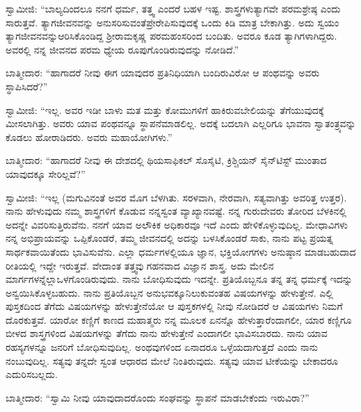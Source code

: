 \vskip 3pt

ಸ್ವಾಮೀಜಿ: “ಬಾಲ್ಯದಿಂದಲೂ ನನಗೆ ಧರ್ಮ, ತತ್ತ್ವ ಎಂದರೆ ಬಹಳ ಇಷ್ಟ. ಶಾಸ್ತ್ರಗಳು\break ತ್ಯಾಗವೇ ಪರಮಶ್ರೇಷ್ಠ ಎಂದು ಸಾರುತ್ತವೆ. ತ್ಯಾಗಜೀವನವನ್ನು ಅನುಸರಿಸುವಂತೆ\break ಪ್ರೇರೇಪಿಸುವುದಕ್ಕೆ ಒಂದು ಕಿಡಿ ಮಾತ್ರ ಬೇಕಾಗಿತ್ತು. ಅದು ಸ್ವಯಂ ತ್ಯಾಗಜೀವನವನ್ನು\break ಆರಿಸಿಕೊಂಡಿದ್ದ ಶ‍್ರೀರಾಮಕೃಷ್ಣ ಪರಮಹಂಸರಿಂದ ಬಂದಿತು. ಅವರೂ ಕೂಡ ತ್ಯಾಗಿಗಳಾಗಿದ್ದರು. ಅವರಲ್ಲಿ ನನ್ನ ಜೀವನದ ಪರಮ ಧ್ಯೇಯ ರೂಪುಗೊಂಡಿರುವುದನ್ನು ನೋಡಿದೆ.”

\vskip 3pt

ಬಾತ್ಮೀದಾರ: “ಹಾಗಾದರೆ ನೀವು ಈಗ ಯಾವುದರ ಪ್ರತಿನಿಧಿಯಾಗಿ ಬಂದಿರುವಿರೋ ಆ ಪಂಥವನ್ನು ಅವರು ಸ್ಥಾಪಿಸಿದರೆ?”

\vskip 3pt

ಸ್ವಾಮೀಜಿ: “ಇಲ್ಲ. ಅವರ ಇಡೀ ಬಾಳು ಮತ ಮತ್ತು ಕೋಮುಗಳಿಗೆ ಹಾಕಿರುವ\break ಬೇಲಿಯನ್ನು ತೆಗೆಯುವುದಕ್ಕೆ ಮೀಸಲಾಗಿತ್ತು. ಅವರು ಯಾವ ಪಂಥವನ್ನೂ ಸ್ಥಾಪನೆ\break ಮಾಡಲಿಲ್ಲ. ಅದಕ್ಕೆ ಬದಲಾಗಿ ಎಲ್ಲರಿಗೂ ಭಾವನಾ ಸ್ವಾತಂತ್ರ್ಯವನ್ನು ಕೊಡಲು ಹೋರಾಡಿದರು. ಅವರು ಮಹಾಯೋಗಿಗಳು.”

\vskip 3pt

ಬಾತ್ಮೀದಾರ: “ಹಾಗಾದರೆ ನೀವು ಈ ದೇಶದಲ್ಲಿ ಥಿಯಸಾಫಿಕಲ್​ ಸೊಸೈಟಿ, ಕ್ರಿಶ್ಚಿಯನ್​ ಸೈನ್​ಟಿಸ್ಟ್​ ಮುಂತಾದ ಯಾವುದಕ್ಕೂ ಸೇರಿಲ್ಲವೆ?”

\vskip 3pt

ಸ್ವಾಮೀಜಿ: “ಇಲ್ಲ (ಮಗುವಿನಂತೆ ಅವರ ಮೊಗ ಬೆಳಗಿತು. ಸರಳವಾಗಿ, ನೇರವಾಗಿ, ಸತ್ಯವಾಗಿತ್ತು ಅವರಿತ್ತ ಉತ್ತರ). ನಾನು ಹೇಳುವುದು ನಮ್ಮ ಶಾಸ್ತ್ರಗಳಿಗೆ ಕೊಡುವ ನನ್ನ\break ಸ್ವಂತ ವ್ಯಾಖ್ಯಾನವಷ್ಟೆ. ನನ್ನ ಗುರುದೇವರು ತೋರಿದ ಬೆಳಕಿನಲ್ಲಿ ಅದನ್ನೇ ವಿವರಿಸುತ್ತಿರುವೆನು. ನನಗೆ ಯಾವ ಅಲೌಕಿಕ ಅಧಿಕಾರವೂ ಇದೆ ಎಂದು ಹೇಳಿಕೊಳ್ಳುವುದಿಲ್ಲ. ಮೇಧಾವಿಗಳು ನನ್ನ ಅಭಿಪ್ರಾಯವನ್ನು ಒಪ್ಪಿಕೊಂಡರೆ, ತಮ್ಮ ಜೀವನದಲ್ಲಿ ಅದನ್ನು ಬಳಸಿಕೊಂಡರೆ ಸಾಕು, ನಾನು ಪಟ್ಟ ಪ್ರಯತ್ನ ಸಾರ್ಥಕವಾಯಿತೆಂದು ಭಾವಿಸುವೆನು. ಎಲ್ಲಾ ಧರ್ಮಗಳಲ್ಲಿಯೂ ಜ್ಞಾನ, ಭಕ್ತಿಯೋಗಗಳು ಅನುಷ್ಠಾನ ಮಾಡಬಹುದಾದ ರೀತಿಯಲ್ಲಿ ಇದ್ದೇ ಇರುತ್ತವೆ. ವೇದಾಂತ ತತ್ತ್ವವು ಗಹನವಾದ ವಿಜ್ಞಾನ ಶಾಸ್ತ್ರ. ಅದು ಮೇಲಿನ ಮಾರ್ಗಗಳನ್ನೆಲ್ಲಾ\break ಒಳಗೊಂಡಿರುವುದು. ನಾನು ಬೋಧಿಸುವುದು ಇದನ್ನೇ. ಪ್ರತಿಯೊಬ್ಬನೂ ತನ್ನ ತನ್ನ ಧರ್ಮಕ್ಕೆ ಇದನ್ನು ಅನ್ವಯಿಸಿಕೊಳ್ಳಬಹುದು. ನಾನು ಪ್ರತಿಯೊಬ್ಬನ ಅನುಭವಕ್ಕೂ\break ನಿಲುಕುವಂತಹ ವಿಷಯಗಳನ್ನು ಹೇಳುತ್ತೇನೆ. ಎಲ್ಲಿ ಪುಸ್ತಕದಿಂದ ತೆಗೆದು ವಿಷಯಗಳನ್ನು ಹೇಳುತ್ತೇನೆಯೋ ಆ ಪುಸ್ತಕಗಳಲ್ಲಿ ನೀವು ನೋಡಿದರೆ ಆ ವಿಷಯಗಳು ನಿಮಗೆ ದೊರಕುತ್ತವೆ. ಯಾರೋ ಕಣ್ಣಿಗೆ ಕಾಣದ ಮಹಾತ್ಮರು ನನ್ನ ಮೂಲಕ ಏನನ್ನೊ ಹೇಳುತ್ತಾರೆಂದಾಗಲೀ, ಯಾರ ಕಣ್ಣಿಗೂ ಬೀಳದ ಶಾಸ್ತ್ರಗಳಿಂದ ವಿಷಯಗಳನ್ನು ತೆಗೆದು ನಾನು ಹೇಳುತ್ತೇನೆ ಎಂದಾಗಲೀ ಭಾವಿಸಬಾರದು. ನಾನು ಯಾವ ರಹಸ್ಯಗಳನ್ನೂ ಜನರಿಗೆ ಬೋಧಿಸುವುದಿಲ್ಲ. ಅಂಥವುಗಳಿಂದ ಏನಾದರೂ ಒಳ್ಳೆಯದಾಗುತ್ತದೆ ಎಂದು ನಾನು ನಂಬುವುದಿಲ್ಲ. ಸತ್ಯವು ತನ್ನದೇ ಸ್ವಂತ ಆಧಾರದ ಮೇಲೆ ನಿಂತಿರುವುದು. ಸತ್ಯವು ಯಾವ ಟೀಕೆಯನ್ನು ಬೇಕಾದರೂ ಎದುರಿಸಬಲ್ಲದು.

\vskip 3pt

ಬಾತ್ಮೀದಾರ: “ಸ್ವಾಮಿ ನೀವು ಯಾವುದಾದರೊಂದು ಸಂಘವನ್ನು ಸ್ಥಾಪನೆ ಮಾಡಬೇಕೆಂದು ಇರುವಿರಾ?”

\vskip 3pt

